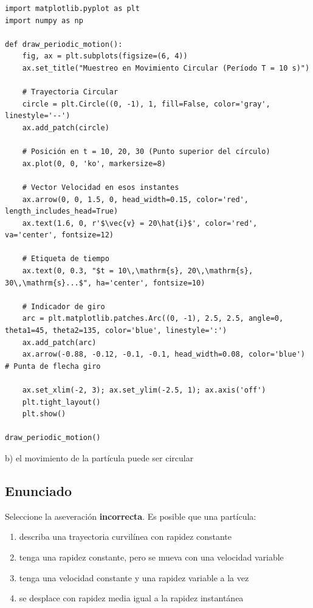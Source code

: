 \documentclass[12pt, a4paper]{article}
\begin{document}
\begin{lstlisting}
import matplotlib.pyplot as plt
import numpy as np

def draw_periodic_motion():
    fig, ax = plt.subplots(figsize=(6, 4))
    ax.set_title("Muestreo en Movimiento Circular (Período T = 10 s)")
    
    # Trayectoria Circular
    circle = plt.Circle((0, -1), 1, fill=False, color='gray', linestyle='--')
    ax.add_patch(circle)
    
    # Posición en t = 10, 20, 30 (Punto superior del círculo)
    ax.plot(0, 0, 'ko', markersize=8) 
    
    # Vector Velocidad en esos instantes
    ax.arrow(0, 0, 1.5, 0, head_width=0.15, color='red', length_includes_head=True)
    ax.text(1.6, 0, r'$\vec{v} = 20\hat{i}$', color='red', va='center', fontsize=12)
    
    # Etiqueta de tiempo
    ax.text(0, 0.3, "$t = 10\,\mathrm{s}, 20\,\mathrm{s}, 30\,\mathrm{s}...$", ha='center', fontsize=10)
    
    # Indicador de giro
    arc = plt.matplotlib.patches.Arc((0, -1), 2.5, 2.5, angle=0, theta1=45, theta2=135, color='blue', linestyle=':')
    ax.add_patch(arc)
    ax.arrow(-0.88, -0.12, -0.1, -0.1, head_width=0.08, color='blue') # Punta de flecha giro

    ax.set_xlim(-2, 3); ax.set_ylim(-2.5, 1); ax.axis('off')
    plt.tight_layout()
    plt.show()

draw_periodic_motion()
\end{lstlisting}

\begin{tcolorbox}[colback=green!5!white, colframe=green!50!black, title=Respuesta Final]
\centering \Large b) el movimiento de la partícula puede ser circular
\end{tcolorbox}

\newpage

\subsection*{Enunciado}
Seleccione la aseveración \textbf{incorrecta}. Es posible que una partícula:
\begin{enumerate}[label=\alph*)]
    \item describa una trayectoria curvilínea con rapidez constante
    \item tenga una rapidez constante, pero se mueva con una velocidad variable
    \item tenga una velocidad constante y una rapidez variable a la vez
    \item se desplace con rapidez media igual a la rapidez instantánea
\end{enumerate}
\end{document}
